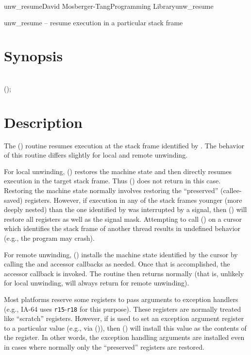 \documentclass{article}
\begin{document}
\begin{Name}{3}{unw\_resume}{David Mosberger-Tang}{Programming Library}{unw\_resume}

  unw\_resume -- resume execution in a particular stack frame
\end{Name}

\section{Synopsis}

\\

 ();\\

\section{Description}

The () routine resumes execution at the stack frame
identified by .  The behavior of this routine differs
slightly for local and remote unwinding.

For local unwinding, () restores the machine state
and then directly resumes execution in the target stack frame.  Thus
() does not return in this case.  Restoring the
machine state normally involves restoring the ``preserved''
(callee-saved) registers.  However, if execution in any of the stack
frames younger (more deeply nested) than the one identified by
 was interrupted by a signal, then () will
restore all registers as well as the signal mask.  Attempting to call
() on a cursor which identifies the stack frame of
another thread results in undefined behavior (e.g., the program may
crash).

For remote unwinding, () installs the machine state
identified by the cursor by calling the  and
 accessor callbacks as needed.  Once that is
accomplished, the  accessor callback is invoked.  The
 routine then returns normally (that is, unlikely
for local unwinding,  will always return for remote
unwinding).

Most platforms reserve some registers to pass arguments to exception
handlers (e.g., IA-64 uses \texttt{r15}-\texttt{r18} for this
purpose).  These registers are normally treated like ``scratch''
registers.  However, if  is used to set an exception
argument register to a particular value (e.g., via
()), then () will install this
value as the contents of the register.  In other words, the exception
handling arguments are installed even in cases where normally only the
``preserved'' registers are restored.
\end{document}
